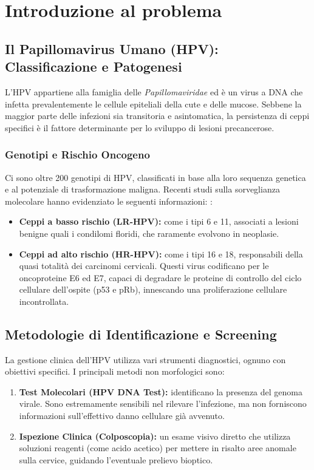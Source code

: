 \chapter{Introduzione al problema}

\section{Il Papillomavirus Umano (HPV): Classificazione e Patogenesi}
L'HPV appartiene alla famiglia delle \textit{Papillomaviridae} ed è un virus a DNA che infetta prevalentemente le cellule epiteliali della cute e delle mucose. Sebbene la maggior parte delle infezioni sia transitoria e asintomatica, la persistenza di ceppi specifici è il fattore determinante per lo sviluppo di lesioni precancerose.

\subsection{Genotipi e Rischio Oncogeno}
Ci sono oltre 200 genotipi di HPV, classificati in base alla loro sequenza genetica e al potenziale di trasformazione maligna. Recenti studi sulla sorveglianza molecolare hanno evidenziato le seguenti informazioni: \cite{hpv_molecular_2025}:
\begin{itemize}
	\item \textbf{Ceppi a basso rischio (LR-HPV):} come i tipi 6 e 11, associati a lesioni benigne quali i condilomi floridi, che raramente evolvono in neoplasie.
	\item \textbf{Ceppi ad alto rischio (HR-HPV):} come i tipi 16 e 18, responsabili della quasi totalità dei carcinomi cervicali. Questi virus codificano per le oncoproteine E6 ed E7, capaci di degradare le proteine di controllo del ciclo cellulare dell'ospite (p53 e pRb), innescando una proliferazione cellulare incontrollata.
\end{itemize}

\section{Metodologie di Identificazione e Screening}
La gestione clinica dell'HPV utilizza vari strumenti diagnostici, ognuno con obiettivi specifici. I principali metodi non morfologici sono:
\begin{enumerate}
	\item \textbf{Test Molecolari (HPV DNA Test):} identificano la presenza del genoma virale. Sono estremamente sensibili nel rilevare l'infezione, ma non forniscono informazioni sull'effettivo danno cellulare già avvenuto.
	\item \textbf{Ispezione Clinica (Colposcopia):} un esame visivo diretto che utilizza soluzioni reagenti (come acido acetico) per mettere in risalto aree anomale sulla cervice, guidando l'eventuale prelievo bioptico.
\end{enumerate}

